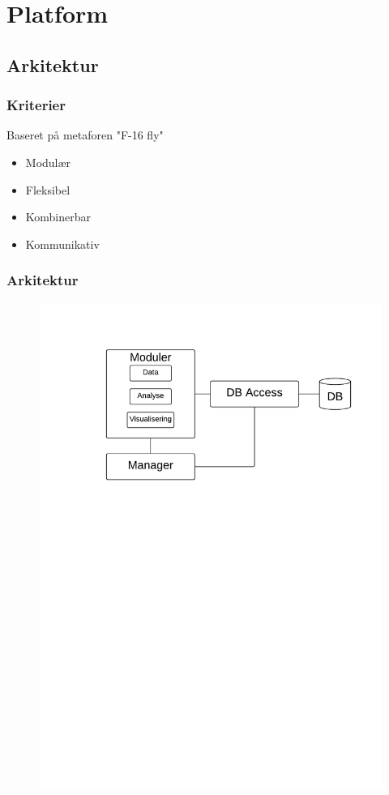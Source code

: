 \section{Platform}
\subsection{Arkitektur}
\begin{frame}
\frametitle{Kriterier}
Baseret på metaforen "F-16 fly"
\begin{itemize}
\item Modulær
\item Fleksibel
\item Kombinerbar
\item Kommunikativ
\end{itemize}
\end{frame}

\begin{frame}
\frametitle{Arkitektur}
\begin{figure}[h]
	\centering						%
	\includegraphics[scale=0.5, trim = 1cm 17.5cm 1cm 1cm, clip]{../grafik/ArkitekturLucidChart}
\end{figure}
\end{frame}

